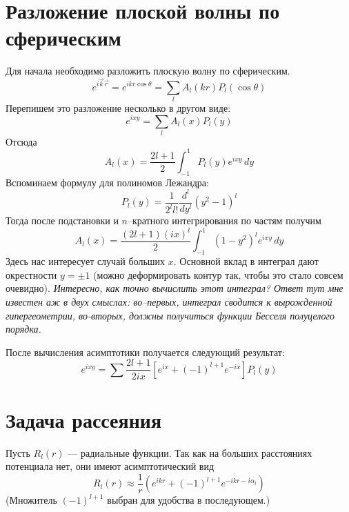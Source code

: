 \documentclass{article}
\begin{document}
\section{Разложение плоской волны по сферическим}
Для начала необходимо разложить плоскую волну по сферическим.
\begin{equation}
	e^{i\vec{k}\vec{r}} = e^{ikr\cos{\theta}} = \sum_l A_l(kr) P_l(\cos{\theta})
\end{equation}
Перепишем это разложение несколько в другом виде:
\begin{equation}
	e^{ixy} = \sum_l A_l(x) P_l(y)
\end{equation}
Отсюда
\begin{equation}
	A_l(x) = \frac{2l+1}{2} \int_{-1}^{1} P_l(y) e^{ixy} \, dy
\end{equation}
Вспоминаем формулу для полиномов Лежандра:
\begin{equation}
	P_l(y) = \frac{1}{2^l l!} \frac{d^l}{dy^l} (y^2 - 1)^l
\end{equation}
Тогда после подстановки и $n$--кратного интегрирования по частям получим 
\begin{equation}
	A_l(x) = \frac{(2l+1)(ix)^l}{2} \int_{-1}^{1} (1-y^2)^l e^{ixy} \, dy
\end{equation}
Здесь нас интересует случай больших $x$. Основной вклад в интеграл дают окрестности 
$y = \pm 1$ (можно деформировать контур так, чтобы это стало совсем очевидно).
{ \it Интересно, как точно вычислить этот интеграл? Ответ тут мне известен аж в двух
смыслах: во--первых, интеграл сводится к вырожденной гипергеометрии, 
во-вторых, должны получиться
функции Бесселя полуцелого порядка. }

После вычисления асимптотики получается следующий результат:
\begin{equation}
    e^{ixy} = \sum \frac{2l+1}{2ix} \left[ e^{ix} + (-1)^{l+1} e^{-ix} \right] P_l(y)
\end{equation}

\section{Задача рассеяния}
Пусть $R_l(r)$ --- радиальные функции. Так как на больших расстояниях потенциала нет,
они имеют асимптотический вид
\begin{equation}
    R_l(r) \approx \frac{1}{r}\left(e^{ikr} + (-1)^{l+1}e^{-ikr-i\alpha_l}\right)
\end{equation}
(Множитель $(-1)^{l+1}$ выбран для удобства в последующем.)    
\end{document}
